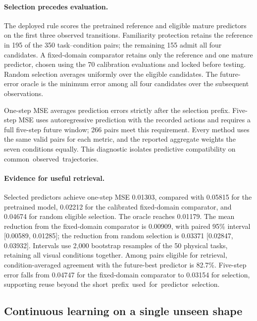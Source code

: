 \paragraph{Selection precedes evaluation.}
The deployed rule scores the pretrained reference and eligible mature predictors on the first three observed transitions. Familiarity protection retains the reference in 195 of the 350 task--condition pairs; the remaining 155 admit all four candidates. A fixed-domain comparator retains only the reference and one mature predictor, chosen using the 70 calibration evaluations and locked before testing. Random selection averages uniformly over the eligible candidates. The future-error oracle is the minimum error among all four candidates over the subsequent observations.

One-step MSE averages prediction errors strictly after the selection prefix. Five-step MSE uses autoregressive prediction with the recorded actions and requires a full five-step future window; 266 pairs meet this requirement. Every method uses the same valid pairs for each metric, and the reported aggregate weights the seven conditions equally. This diagnostic isolates predictive compatibility on \mbox{common observed trajectories}.

\paragraph{Evidence for useful retrieval.}
Selected predictors achieve one-step MSE 0.01303, compared with 0.05815 for the pretrained model, 0.02212 for the calibrated fixed-domain comparator, and 0.04674 for random eligible selection. The oracle reaches 0.01179. The mean reduction from the fixed-domain comparator is 0.00909, with paired 95\% interval [0.00589, 0.01285]; the reduction from random selection is 0.03371 [0.02847, 0.03932]. Intervals use 2,000 bootstrap resamples of the 50 physical tasks, retaining all visual conditions together. Among pairs eligible for retrieval, condition-averaged agreement with the future-best predictor is 82.7\%. Five-step error falls from 0.04747 for the fixed-domain comparator to 0.03154 for selection, supporting reuse beyond the \mbox{short prefix used for predictor selection}.

\subsection{Continuous learning on a single unseen shape}
\label{app:i_only}

